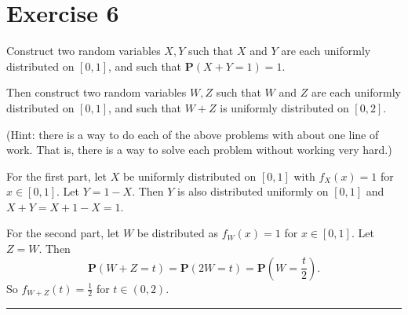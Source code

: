\documentclass{article}
\theoremstyle{break}
\newenvironment{solution}{{\bf Solution:}}{\hfill\rule{2mm}{2mm}}
\renewcommand{\P}{\mathbf{P}}
\begin{document}
\section*{Exercise 6}
Construct two random variables $X,Y$ such that $X$ and $Y$ are each uniformly distributed on $[0,1]$, and such that $\P(X+Y=1)=1$.

Then construct two random variables $W,Z$ such that $W$ and $Z$ are each uniformly distributed on $[0,1]$, and such that $W+Z$ is uniformly distributed on $[0,2]$.

(Hint: there is a way to do each of the above problems with about one line of work.  That is, there is a way to solve each problem without working very hard.)

\begin{solution}
For the first part, let $X$ be uniformly distributed on $[0,1]$ with $f_X(x) = 1$ for $x \in [0,1]$. Let $Y = 1 - X$. Then $Y$ is also distributed uniformly on $[0,1]$ and $X + Y = X + 1 - X = 1$. 

For the second part, let $W$ be distributed as $f_W(x) = 1$ for $x \in [0,1]$. Let $Z = W$. Then 
\[ \P(W + Z = t) = \P(2W = t) = \P\left(W = \frac{t}{2}\right).
\]
So $f_{W+Z}(t) = \frac{1}{2}$ for $t \in (0,2)$.
\begin{comment}
\begin{align*}
f_W(x) &= \P(W = x) \\
	&= \P(2W = 2x) \\
	&= \P(W + Z = 2x)
\end{align*}
\end{comment}
\end{solution}
\end{document}
